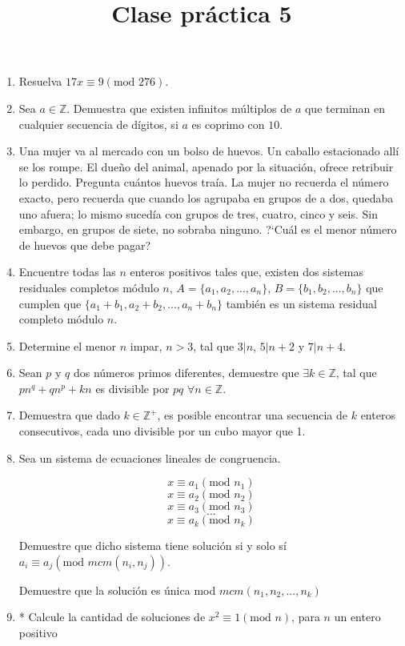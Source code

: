 \documentclass{article}
\title{Clase pr\'actica 5}
\begin{document}
\maketitle
\begin{enumerate}
    \item Resuelva $17x \equiv 9 (\text{mod } 276)$.
    \item Sea $a \in \mathbb{Z}$. Demuestra que existen infinitos m\'ultiplos de $a$ que terminan en cualquier secuencia de d\'igitos, si $a$ es coprimo con $10$.
    \item Una mujer va al mercado con un bolso de huevos. Un caballo estacionado all\'i se los rompe. El due\~no del animal, apenado por la situaci\'on, ofrece retribuir lo perdido. Pregunta cu\'antos huevos tra\'ia. La mujer no recuerda el n\'umero exacto, pero recuerda que cuando los agrupaba en grupos de a dos, quedaba uno afuera; lo mismo suced\'ia con grupos de tres, cuatro, cinco y seis. Sin embargo, en grupos de siete, no sobraba ninguno. ?`Cu\'al es el menor n\'umero de huevos que debe pagar?
    \item Encuentre todas las $n$ enteros positivos tales que, existen dos sistemas residuales completos módulo $n$, $A = \{a_1, a_2, ..., a_n\}$, $B = \{b_1, b_2, ..., b_n\}$ que cumplen que $\{a_1 + b_1, a_2 + b_2, ..., a_n + b_n\}$ también es un sistema residual completo módulo $n$.
    \item Determine el menor $n$ impar, $n > 3$, tal que $3|n$, $5|n+2$ y $7|n+4$.
    \item Sean $p$ y $q$ dos n\'umeros primos diferentes, demuestre que $\exists k \in \mathbb{Z}$, tal que $pn^{q} + qn^{p} + kn$ es divisible por $pq$ $\forall n \in \mathbb{Z}$.
    \item Demuestra que dado $k \in \mathbb{Z}^{+}$, es posible encontrar una secuencia de $k$ enteros consecutivos, cada uno divisible por un cubo mayor que 1.
    \item Sea un sistema de ecuaciones lineales de congruencia.

    $$ x \equiv a_1 (\text{mod } n_1)$$
    $$x \equiv a_2 (\text{mod } n_2)$$
    $$x \equiv a_3 (\text{mod } n_3)$$ 
    $$...$$
    $$x \equiv a_k (\text{mod } n_k) $$

    Demuestre que dicho sistema tiene solución si y solo sí $ a_i \equiv a_j (\text{mod } mcm(n_i, n_j))$.

    Demuestre que la solución es única mod $mcm(n_1, n_2, ..., n_k)$

    \item * Calcule la cantidad de soluciones de $x^2 \equiv 1 (\text{mod } n)$, para $n$ un entero positivo
\end{enumerate}
\end{document}
